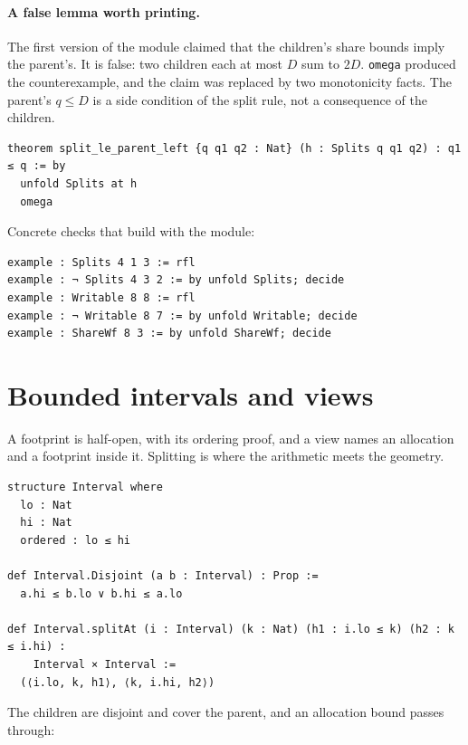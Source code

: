 \documentclass[10pt,a4paper]{article}
\newcommand{\file}[1]{\texttt{\small #1}}
\begin{document}
\paragraph{A false lemma worth printing.} The first version of the module claimed
that the children's share bounds imply the parent's. It is false: two children
each at most $D$ sum to $2D$. \texttt{omega} produced the counterexample, and the
claim was replaced by two monotonicity facts. The parent's $q \le D$ is a side
condition of the split rule, not a consequence of the children.

\begin{lstlisting}[caption={The valid monotonicity facts; the parent-bound version was removed.}]
theorem split_le_parent_left {q q1 q2 : Nat} (h : Splits q q1 q2) : q1 ≤ q := by
  unfold Splits at h
  omega
\end{lstlisting}

Concrete checks that build with the module:

\begin{lstlisting}[caption={Decidable examples in \file{Cap/Share.lean}.}]
example : Splits 4 1 3 := rfl
example : ¬ Splits 4 3 2 := by unfold Splits; decide
example : Writable 8 8 := rfl
example : ¬ Writable 8 7 := by unfold Writable; decide
example : ShareWf 8 3 := by unfold ShareWf; decide
\end{lstlisting}

\section{Bounded intervals and views}

A footprint is half-open, with its ordering proof, and a view names an allocation
and a footprint inside it. Splitting is where the arithmetic meets the geometry.

\begin{lstlisting}[caption={\file{Cap/Footprint.lean}.}]
structure Interval where
  lo : Nat
  hi : Nat
  ordered : lo ≤ hi

def Interval.Disjoint (a b : Interval) : Prop :=
  a.hi ≤ b.lo ∨ b.hi ≤ a.lo

def Interval.splitAt (i : Interval) (k : Nat) (h1 : i.lo ≤ k) (h2 : k ≤ i.hi) :
    Interval × Interval :=
  (⟨i.lo, k, h1⟩, ⟨k, i.hi, h2⟩)
\end{lstlisting}

The children are disjoint and cover the parent, and an allocation bound passes
through:
\end{document}
